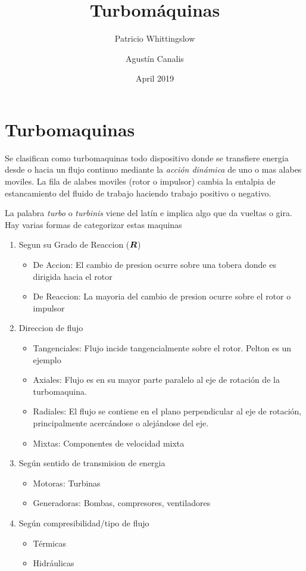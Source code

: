 \documentclass{article}
\title{Turbomáquinas}
\author{Patricio Whittingslow \and Agustín Canalis}
\date{April 2019}
\begin{document}
\maketitle


\section{Turbomaquinas}
Se clasifican como turbomaquinas todo dispositivo donde se transfiere energia desde o hacia un flujo continuo mediante la \textit{acción dinámica} de uno o mas alabes moviles. La fila de alabes moviles (rotor o impulsor) cambia la entalpia de estancamiento del fluido de trabajo haciendo trabajo positivo o negativo.

La palabra \textit{turbo} o \textit{turbinis} viene del latín e implica algo que da vueltas o gira. Hay varias formas de categorizar estas maquinas

\begin{enumerate}
    \item Segun su Grado de Reaccion (${\bm{R}}$)
    \begin{itemize}
        \item De Accion: El cambio de presion ocurre sobre una tobera donde es dirigida hacia el rotor
        \item De Reaccion: La mayoria del cambio de presion ocurre sobre el rotor o impulsor
    \end{itemize}
    \item Direccion de flujo
    \begin{itemize}
        \item Tangenciales: Flujo incide tangencialmente sobre el rotor. Pelton es un ejemplo
        \item Axiales: Flujo es en su mayor parte paralelo al eje de rotación de la turbomaquina.
        \item Radiales: El flujo se contiene en el plano perpendicular al eje de rotación, principalmente acercándose o alejándose del eje.
        \item Mixtas: Componentes de velocidad mixta
    \end{itemize}
    \item Según sentido de transmision de energia
    \begin{itemize}
        \item Motoras: Turbinas
        \item Generadoras: Bombas, compresores, ventiladores
    \end{itemize}
    \item Según compresibilidad/tipo de flujo
    \begin{itemize}
        \item Térmicas
        \item Hidráulicas
    \end{itemize}
\end{enumerate}
\end{document}
